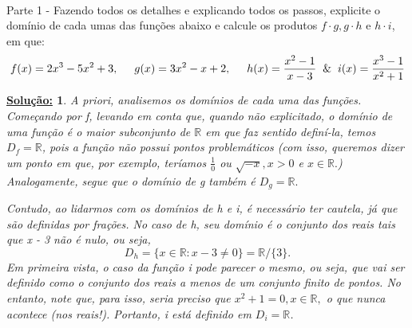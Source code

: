 \documentclass{article}
\newtheorem*{sol*}{\underline{Solu\c c\~ao:}}
\begin{document}
\paragraph{}Parte 1 - Fazendo todos os detalhes e explicando todos os passos, explicite o dom\'inio de cada umas das fun\c c\~oes abaixo e calcule os produtos $f\cdot{}g, g\cdot{}h \text{ e } h\cdot{}i$, em que:
$$
	f(x) = 2x^3 - 5x^2 + 3, \hspace{0.5cm}
	g(x) = 3x^2 - x + 2, \hspace{0.5cm}
	h(x) = \frac{x^2 - 1}{x - 3} \hspace{0.2cm} \text{\&} \hspace{0.2cm}
	i(x) = \frac{x^3 - 1}{x^2 + 1}
$$
\begin{sol*}
	A priori, analisemos os dom\'inios de cada uma das fun\c c\~oes. Come\c cando por f, levando em conta que, quando n\~ao explicitado, o dom\'inio de uma fun\c c\~ao \'e o maior subconjunto de $\mathbb{R}$ em que faz sentido defin\'i-la, temos $D_f = \mathbb{R}$, pois a fun\c c\~ao n\~ao possui pontos problem\'aticos (com isso, queremos dizer um ponto em que, por exemplo, ter\'iamos $\frac{1}{0}$ ou $\sqrt{-x}, x > 0$ e $x\in\mathbb{R}.$) Analogamente, segue que o dom\'inio de g tamb\'em \'e $D_g = \mathbb{R}.$

	Contudo, ao lidarmos com os dom\'inios de h e i, \'e necess\'ario ter cautela, j\'a que s\~ao definidas por fra\c c\~oes. No caso de h, seu dom\'inio \'e o conjunto dos reais tais que x - 3 n\~ao \'e nulo, ou seja,
	$$
		D_h = \{x\in\mathbb{R}: x - 3 \neq 0\} = \mathbb{R}/\{3\}.
	$$
	Em primeira vista, o caso da fun\c c\~ao i pode parecer o mesmo, ou seja, que vai ser definido como o conjunto dos reais a menos de um conjunto finito de pontos. No entanto, note que, para isso, seria preciso que $x^2 + 1 = 0, x\in\mathbb{R},$ o que nunca acontece (nos reais!). Portanto, i est\'a definido em $D_{i} = \mathbb{R}$.


\end{sol*}
\end{document}
